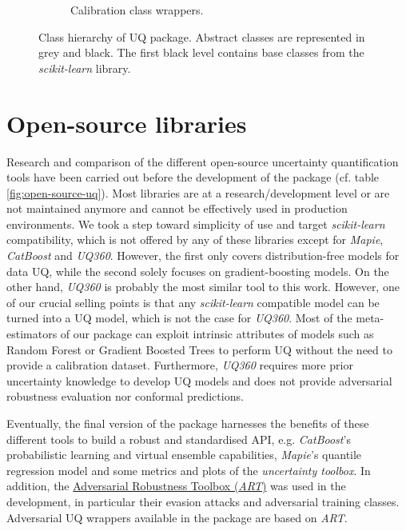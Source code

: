\begin{figure}[htbp]
\begin{subfigure}[b]{0.32\textwidth}
         \caption{Calibration class wrappers.}
         \label{fig:calibration-uq-class}
     \end{subfigure}
        \caption{Class hierarchy of UQ package. Abstract classes are represented in grey and black. The first black level contains base classes from the \textit{scikit-learn} library. }
        \label{fig:class-hierarchy}
\end{figure}





\section{Open-source libraries}

Research and comparison of the different open-source uncertainty quantification tools have been carried out before the development of the package (cf. table \ref{fig:open-source-uq}). 
Most libraries are at a research/development level or are not maintained anymore and cannot be effectively used in production environments. %
We took a step toward simplicity of use and target \textit{scikit-learn} compatibility, which is not offered by any of these libraries except for \textit{Mapie}, \textit{CatBoost} and \textit{UQ360}. However, the first only covers distribution-free models for data UQ, while the second solely focuses on gradient-boosting models. On the other hand, \textit{UQ360} is probably the most similar tool to this work. However, one of our crucial selling points is that any \textit{scikit-learn} compatible model can be turned into a UQ model, which is not the case for \textit{UQ360}. Most of the meta-estimators of our package can exploit intrinsic attributes of models such as Random Forest or Gradient Boosted Trees to perform UQ without the need to provide a calibration dataset. Furthermore, \textit{UQ360} requires more prior uncertainty knowledge to develop UQ models and does not provide adversarial robustness evaluation nor conformal predictions. %

Eventually, the final version of the package harnesses the benefits of these different tools to build a robust and standardised API, e.g. \textit{CatBoost}'s probabilistic learning and virtual ensemble capabilities, \textit{Mapie}'s quantile regression model and some metrics and plots of the \textit{uncertainty toolbox}. In addition, the \href{https://github.com/Trusted-AI/adversarial-robustness-toolbox}{Adversarial Robustness Toolbox (\textit{ART})} was used in the development, in particular their evasion attacks and adversarial training classes. Adversarial UQ wrappers available in the package are based on \textit{ART}. 

